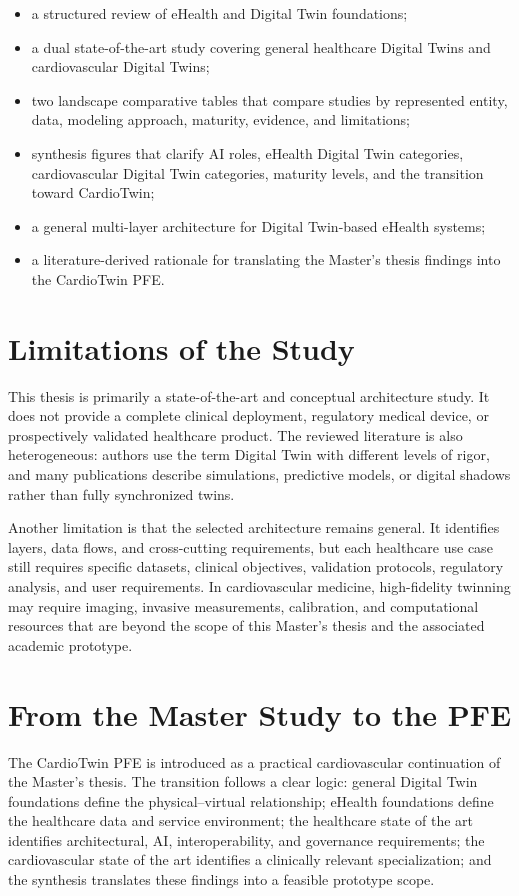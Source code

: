 \begin{itemize}[leftmargin=*]
    \item a structured review of eHealth and Digital Twin foundations;
    \item a dual state-of-the-art study covering general healthcare Digital Twins and cardiovascular Digital Twins;
    \item two landscape comparative tables that compare studies by represented entity, data, modeling approach, maturity, evidence, and limitations;
    \item synthesis figures that clarify AI roles, eHealth Digital Twin categories, cardiovascular Digital Twin categories, maturity levels, and the transition toward CardioTwin;
    \item a general multi-layer architecture for Digital Twin-based eHealth systems;
    \item a literature-derived rationale for translating the Master’s thesis findings into the CardioTwin PFE.
\end{itemize}

\section{Limitations of the Study}
This thesis is primarily a state-of-the-art and conceptual architecture study. It does not provide a complete clinical deployment, regulatory medical device, or prospectively validated healthcare product. The reviewed literature is also heterogeneous: authors use the term Digital Twin with different levels of rigor, and many publications describe simulations, predictive models, or digital shadows rather than fully synchronized twins.

Another limitation is that the selected architecture remains general. It identifies layers, data flows, and cross-cutting requirements, but each healthcare use case still requires specific datasets, clinical objectives, validation protocols, regulatory analysis, and user requirements. In cardiovascular medicine, high-fidelity twinning may require imaging, invasive measurements, calibration, and computational resources that are beyond the scope of this Master’s thesis and the associated academic prototype.

\section{From the Master Study to the PFE}
The CardioTwin PFE is introduced as a practical cardiovascular continuation of the Master’s thesis. The transition follows a clear logic: general Digital Twin foundations define the physical--virtual relationship; eHealth foundations define the healthcare data and service environment; the healthcare state of the art identifies architectural, AI, interoperability, and governance requirements; the cardiovascular state of the art identifies a clinically relevant specialization; and the synthesis translates these findings into a feasible prototype scope.

